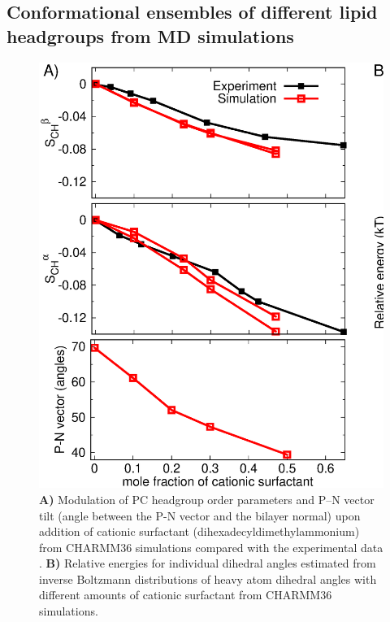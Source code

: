 \documentclass[aps,prl,superscriptaddress,twocolumn]{revtex4}
\begin{document}
\subsection{Conformational ensembles of different lipid headgroups from MD simulations}

\begin{figure}[bt]
  \centering
  \includegraphics[width=18.0cm]{./Figs/HGorderparametersPCvsSURFchangeDIHEDRALSlog.eps}
  \caption{\label{changesWITHsurf}
    \textbf{A)} Modulation of PC headgroup order parameters and P--N vector tilt (angle between the P-N vector and the bilayer normal) upon addition of cationic surfactant (dihexadecyldimethylammonium)
    from CHARMM36 simulations compared with the experimental data \cite{scherer89}.
    \textbf{B)} Relative energies for individual dihedral angles estimated from inverse Boltzmann distributions of heavy atom dihedral angles
    with different amounts of cationic surfactant from CHARMM36 simulations.
  }
\end{figure}
\end{document}
